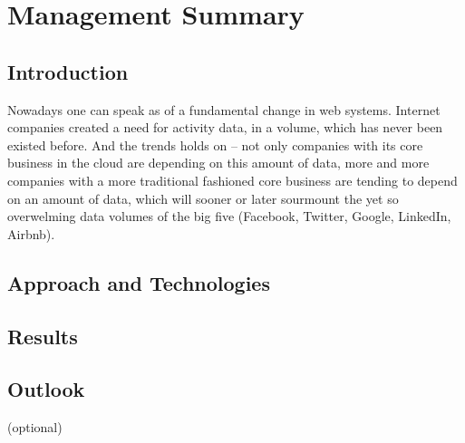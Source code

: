 \chapter{Management Summary}

\section{Introduction}

Nowadays one can speak as of a fundamental change in web systems. Internet companies
created a need for activity data, in a volume, which has never been existed before.
And the trends holds on -- not only companies with its core business in the cloud are
depending on this amount of data, more and more companies with a more traditional 
fashioned core business are tending to depend on an amount of data, which will sooner
or later sourmount the yet so overwelming data volumes of the big five (Facebook, Twitter, Google, LinkedIn, Airbnb).

%

\section{Approach and Technologies}

\section{Results}

\section{Outlook}
(optional)
